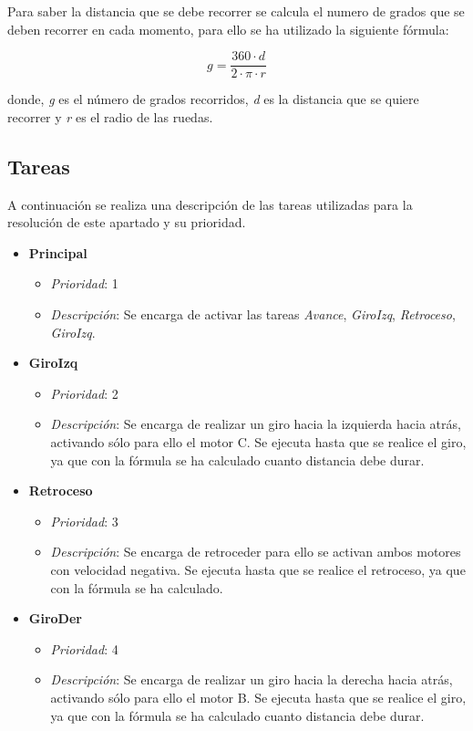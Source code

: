Para saber la distancia que se debe recorrer se calcula el numero de grados que se deben recorrer en cada momento, para ello se ha utilizado la siguiente fórmula:

$$ g=\frac{360  \cdot  d}{2 \cdot \pi \cdot r } $$

donde, \textit{g} es el número de grados recorridos, \textit{d} es la distancia que se quiere recorrer y \textit{r} es el radio de las ruedas.
\subsection{Tareas}
A continuación se realiza una descripción de las tareas utilizadas para la resolución de este apartado y su prioridad.

\begin{itemize}

		\item \textbf{Principal}
		\begin{itemize}
			\item \textit{Prioridad}: 1
			\item \textit{Descripción}: Se encarga de activar las tareas \textit{Avance}, \textit{GiroIzq}, \textit{Retroceso}, \textit{GiroIzq}.
		\end{itemize}
		
		\item \textbf{GiroIzq}
		\begin{itemize}
			\item \textit{Prioridad}: 2
			\item \textit{Descripción}: Se encarga de realizar un giro hacia la izquierda hacia atrás, activando sólo para ello el motor C. Se ejecuta hasta que se realice el giro, ya que con la fórmula se ha calculado cuanto distancia debe durar.
		\end{itemize}
		
		\item \textbf{Retroceso}
		\begin{itemize}
			\item \textit{Prioridad}: 3
			\item \textit{Descripción}: Se encarga de retroceder para ello se activan ambos motores con velocidad negativa. Se ejecuta hasta que se realice el retroceso, ya que con la fórmula se ha calculado.
		\end{itemize}
		
		\item \textbf{GiroDer}
		\begin{itemize}
			\item \textit{Prioridad}: 4
			\item \textit{Descripción}: Se encarga de realizar un giro hacia la derecha hacia atrás, activando sólo para ello el motor B. Se ejecuta hasta que se realice el giro, ya que con la fórmula se ha calculado cuanto distancia debe durar.
		\end{itemize}
		

\end{itemize}
